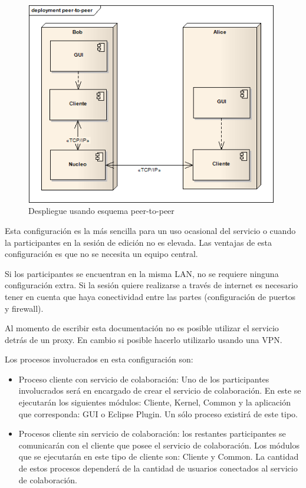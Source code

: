 \documentclass[12pt,a4paper]{article}
\begin{document}
	\begin{figure}[!ht]
		\begin{center}
			\includegraphics[width=11cm]{peer-to-peer.png}
			\caption{\label{peer-to-peer} Despliegue usando esquema peer-to-peer }
		\end{center}
	\end{figure}

Esta configuración es la más sencilla para un uso ocasional del servicio o cuando la participantes en la sesión de edición no
es elevada. Las ventajas de esta configuración es que no se necesita un equipo central.

Si los participantes se encuentran en la misma LAN, no se requiere ninguna configuración extra. Si la sesión quiere realizarse
a través de internet es necesario tener en cuenta que haya conectividad entre las partes (configuración de puertos y firewall).

Al momento de escribir esta documentación no es posible utilizar el servicio detrás de un proxy. En cambio si posible 
hacerlo utilizarlo usando una VPN.

Los procesos involucrados en esta configuración son:
\begin{itemize}
	\item Proceso cliente con servicio de colaboración: Uno de los participantes involucrados será en encargado de crear el
	servicio de colaboración. En este se ejecutarán los siguientes módulos: Cliente, Kernel, Common y la aplicación que
	corresponda: GUI o Eclipse Plugin. Un sólo proceso existirá de este tipo.
	\item Procesos cliente sin servicio de colaboración: los restantes participantes se comunicarán con el cliente que posee
	el servicio de colaboración. Los módulos que se ejecutarán en este tipo de cliente son: Cliente y Common. La cantidad de
	estos procesos dependerá de la cantidad de usuarios conectados al servicio de colaboración.
\end{itemize}
\end{document}
